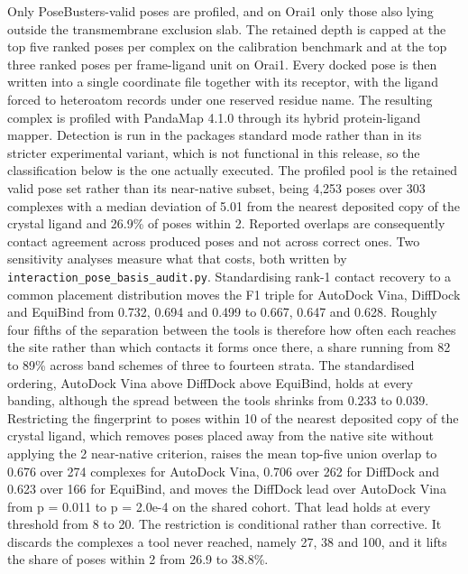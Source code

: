 Only PoseBusters-valid poses are profiled, and on Orai1 only those also lying outside the transmembrane exclusion slab. The retained depth is capped at the top five ranked poses per complex on the calibration benchmark and at the top three ranked poses per frame-ligand unit on Orai1. Every docked pose is then written into a single coordinate file together with its receptor, with the ligand forced to heteroatom records under one reserved residue name. The resulting complex is profiled with PandaMap 4.1.0 \cite{ref090} through its hybrid protein-ligand mapper. Detection is run in the package\textquotesingle s standard mode rather than in its stricter experimental variant, which is not functional in this release, so the classification below is the one actually executed. The profiled pool is the retained valid pose set rather than its near-native subset, being 4,253 poses over 303 complexes with a median deviation of 5.01\angstrom{} from the nearest deposited copy of the crystal ligand and 26.9\% of poses within 2\angstrom{}. Reported overlaps are consequently contact agreement across produced poses and not across correct ones. Two sensitivity analyses measure what that costs, both written by \texttt{interaction\_pose\_basis\_audit.py}. Standardising rank-1 contact recovery to a common placement distribution moves the F1 triple for AutoDock Vina, DiffDock and EquiBind from 0.732, 0.694 and 0.499 to 0.667, 0.647 and 0.628. Roughly four fifths of the separation between the tools is therefore how often each reaches the site rather than which contacts it forms once there, a share running from 82 to 89\% across band schemes of three to fourteen strata. The standardised ordering, AutoDock Vina above DiffDock above EquiBind, holds at every banding, although the spread between the tools shrinks from 0.233 to 0.039. Restricting the fingerprint to poses within 10\angstrom{} of the nearest deposited copy of the crystal ligand, which removes poses placed away from the native site without applying the 2\angstrom{} near-native criterion, raises the mean top-five union overlap to 0.676 over 274 complexes for AutoDock Vina, 0.706 over 262 for DiffDock and 0.623 over 166 for EquiBind, and moves the DiffDock lead over AutoDock Vina from p = 0.011 to p = 2.0e-4 on the shared cohort. That lead holds at every threshold from 8 to 20\angstrom{}. The restriction is conditional rather than corrective. It discards the complexes a tool never reached, namely 27, 38 and 100, and it lifts the share of poses within 2\angstrom{} from 26.9 to 38.8\%.

